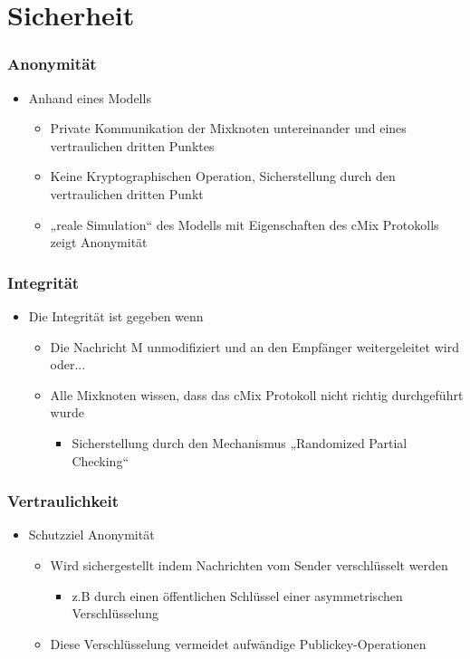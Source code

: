 \documentclass[t, xcolor=dvipsnames]{beamer}
\begin{document}
\section{Sicherheit}

\begin{frame}
	\frametitle{Anonymität}
	\begin{itemize}
		\item Anhand eines Modells
			\begin{itemize}
				\item Private Kommunikation der Mixknoten untereinander und eines vertraulichen dritten Punktes
				\item Keine Kryptographischen Operation, Sicherstellung durch den vertraulichen dritten Punkt
				\item „reale Simulation“ des Modells mit Eigenschaften des cMix Protokolls zeigt Anonymität
			\end{itemize}
	\end{itemize}
	\vspace{\fill}
\end{frame}

\begin{frame}
	\frametitle{Integrität}
	\begin{itemize}
		\item Die Integrität ist gegeben wenn
			\begin{itemize}
				\item Die Nachricht M unmodifiziert und an den Empfänger weitergeleitet wird oder...
				\item Alle Mixknoten wissen, dass das cMix Protokoll nicht richtig durchgeführt wurde
					\begin{itemize}
						\item Sicherstellung durch den Mechanismus „Randomized Partial Checking“
					\end{itemize}
			\end{itemize}
	\end{itemize}
	\vspace{\fill}
\end{frame}

\begin{frame}
	\frametitle{Vertraulichkeit}
	\begin{itemize}
		\item Schutzziel Anonymität
			\begin{itemize}
				\item Wird sichergestellt indem Nachrichten vom Sender verschlüsselt werden
					\begin{itemize}
						\item z.B durch einen öffentlichen Schlüssel einer asymmetrischen Verschlüsselung
					\end{itemize}
				\item Diese Verschlüsselung vermeidet aufwändige Publickey-Operationen 
			\end{itemize}
	\end{itemize}
	\vspace{\fill}
\end{frame}
\end{document}
